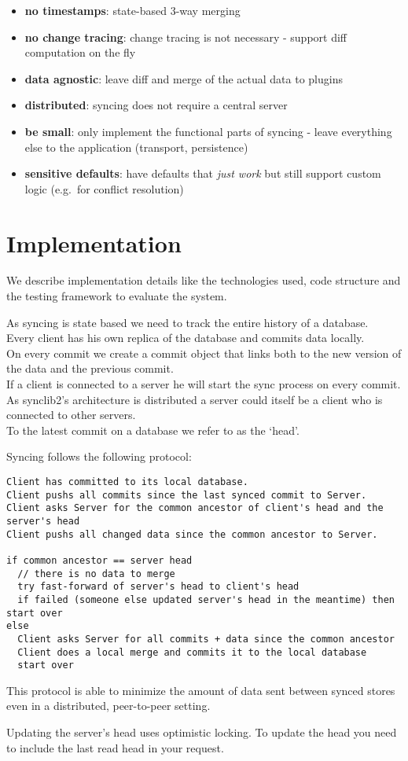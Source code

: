 \begin{itemize}
\item
  \textbf{no timestamps}: state-based 3-way merging
\item
  \textbf{no change tracing}: change tracing is not necessary - support
  diff computation on the fly
\item
  \textbf{data agnostic}: leave diff and merge of the actual data to
  plugins
\item
  \textbf{distributed}: syncing does not require a central server
\item
  \textbf{be small}: only implement the functional parts of syncing -
  leave everything else to the application (transport, persistence)
\item
  \textbf{sensitive defaults}: have defaults that \emph{just work} but
  still support custom logic (e.g.~for conflict resolution)
\end{itemize}

\section{Implementation}
We describe implementation details like the technologies used, code structure and the testing framework to evaluate the system.

As syncing is state based we need to track the entire history of a
database.\\Every client has his own replica of the database and commits
data locally.\\On every commit we create a commit object that links both
to the new version of the data and the previous commit.\\If a client is
connected to a server he will start the sync process on every commit. As
synclib2's architecture is distributed a server could itself be a client
who is connected to other servers.\\To the latest commit on a database
we refer to as the `head'.

Syncing follows the following protocol:

\begin{verbatim}
Client has committed to its local database.
Client pushs all commits since the last synced commit to Server.
Client asks Server for the common ancestor of client's head and the server's head
Client pushs all changed data since the common ancestor to Server.

if common ancestor == server head
  // there is no data to merge
  try fast-forward of server's head to client's head
  if failed (someone else updated server's head in the meantime) then start over
else
  Client asks Server for all commits + data since the common ancestor
  Client does a local merge and commits it to the local database
  start over
\end{verbatim}

This protocol is able to minimize the amount of data sent between synced
stores even in a distributed, peer-to-peer setting.

Updating the server's head uses optimistic locking. To update the head
you need to include the last read head in your request.
